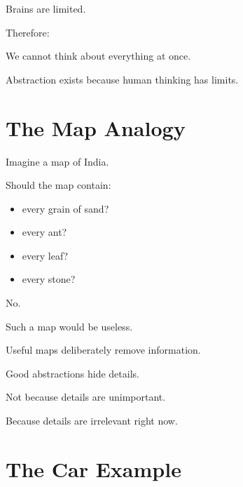 \documentclass[11pt,a4paper]{book}
\begin{document}
Brains are limited.

Therefore:

\begin{center}
We cannot think about everything at once.
\end{center}

Abstraction exists because human thinking has limits.


\section{The Map Analogy}

\begin{mentalmodel}

Imagine a map of India.

Should the map contain:

\begin{itemize}
\item every grain of sand?
\item every ant?
\item every leaf?
\item every stone?
\end{itemize}

No.

Such a map would be useless.

\end{mentalmodel}


Useful maps deliberately remove information.


\begin{rosettarule}

Good abstractions hide details.

Not because details are unimportant.

Because details are irrelevant right now.

\end{rosettarule}


\section{The Car Example}
\end{document}
